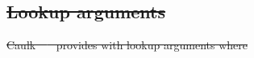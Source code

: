 \documentclass[sigconf]{acmart}
\providecommand{\DIFdeltex}[1]{{\protect\color{red}\sout{#1}}}                      %
\providecommand{\DIFaddbegin}{} %
\providecommand{\DIFdelbegin}{} %
\providecommand{\DIFdelend}{} %
\providecommand{\DIFdel}[1]{\texorpdfstring{\DIFdeltex{#1}}{}} %
\newcommand{\DIFscaledelfig}{0.5}
\newlength{\DIFdelgraphicswidth} %
\newlength{\DIFdelgraphicsheight} %
\newcommand{\DIFaddincludegraphics}[2][]{{\color{blue}\fbox{\DIFOincludegraphics[#1]{#2}}}} %
\newcommand{\DIFdelincludegraphics}[2][]{%
	\sbox{\DIFdelgraphicsbox}{\DIFOincludegraphics[#1]{#2}}%
	\settoboxwidth{\DIFdelgraphicswidth}{\DIFdelgraphicsbox} %
	\settoboxtotalheight{\DIFdelgraphicsheight}{\DIFdelgraphicsbox} %
	\scalebox{\DIFscaledelfig}{%
		\parbox[b]{\DIFdelgraphicswidth}{\usebox{\DIFdelgraphicsbox}\\[-\baselineskip] \rule{\DIFdelgraphicswidth}{0em}}\llap{\resizebox{\DIFdelgraphicswidth}{\DIFdelgraphicsheight}{%
				\setlength{\unitlength}{\DIFdelgraphicswidth}%
				\begin{picture}(1,1)%
					\thicklines\linethickness{2pt} %
					{\color[rgb]{1,0,0}\put(0,0){\framebox(1,1){}}}%
					{\color[rgb]{1,0,0}\put(0,0){\line( 1,1){1}}}%
					{\color[rgb]{1,0,0}\put(0,1){\line(1,-1){1}}}%
				\end{picture}%
			}\hspace*{3pt}}} %
} %
\DeclareRobustCommand{\DIFaddbegin}{\DIFOaddbegin \let\includegraphics\DIFaddincludegraphics} %
\DeclareRobustCommand{\DIFdelbegin}{\DIFOdelbegin \let\includegraphics\DIFdelincludegraphics} %
\DeclareRobustCommand{\DIFdelend}{\DIFOaddend \let\includegraphics\DIFOincludegraphics} %
\begin{document}
	\DIFdelbegin \subsection{\DIFdel{Lookup arguments}}
	\addtocounter{subsection}{-1}%
	\DIFdelend %
	
	
	\DIFdelbegin \DIFdel{Caulk~\mbox{%
			\cite{CCS:ZBKMNS22} }\hskip0pt%
		provides with lookup arguments where }\DIFdelend \DIFaddbegin \smallskip
	
\smallskip
\end{document}
